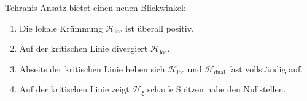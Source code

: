 \documentclass[11pt,a4paper]{article}
\newcommand{\Hxi}{\mathcal{H}_{\xi}}
\newcommand{\Hlocal}{\mathcal{H}_{\mathrm{loc}}}
\newcommand{\Hdual}{\mathcal{H}_{\mathrm{dual}}}
\theoremstyle{definition}
\theoremstyle{remark}
\begin{document}
	Tehranis Ansatz bietet einen neuen Blickwinkel:
	
	\begin{enumerate}
		\item Die lokale Kr\"ummung $\Hlocal$ ist \"uberall positiv.
		\item Auf der kritischen Linie divergiert $\Hlocal$.
		\item Abseits der kritischen Linie heben sich $\Hlocal$ und $\Hdual$ fast vollst\"andig auf.
		\item Auf der kritischen Linie zeigt $\Hxi$ scharfe Spitzen nahe den Nullstellen.
	\end{enumerate}
	
\end{document}
